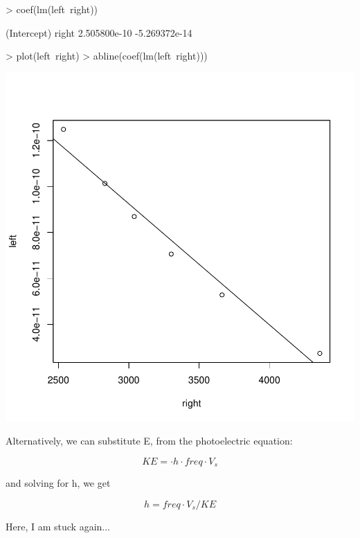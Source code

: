 \documentclass{article}
\begin{document}
\begin{Schunk}
\begin{Sinput}
> coef(lm(left~right))
\end{Sinput}
\begin{Soutput}
  (Intercept)         right 
 2.505800e-10 -5.269372e-14 
\end{Soutput}
\begin{Sinput}
> plot(left~right)
> abline(coef(lm(left~right)))
\end{Sinput}
\end{Schunk}
\includegraphics{Chemistry1-005}

Alternatively, we can substitute E, from the photoelectric equation:

\begin{equation}
KE = \cdot h \cdot freq \cdot V_s
\end{equation}

and solving for h, we get

\begin{equation}
h = freq \cdot V_s /KE
\end{equation}

Here, I am stuck again...
\end{document}
